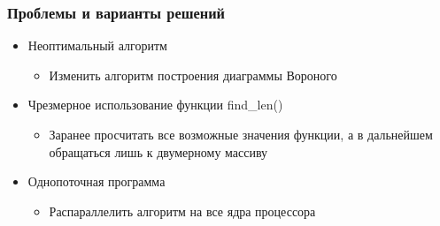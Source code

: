 \documentclass[10pt]{beamer}
\begin{document}
\begin{frame}
\frametitle{Проблемы и варианты решений}


\begin{block}{}
  \begin{itemize}
    \item Неоптимальный алгоритм
    \begin{itemize}
      \item Изменить алгоритм построения диаграммы Вороного
    \end{itemize}
    \item Чрезмерное использование функции find\_len()
    \begin{itemize}
      \item Заранее просчитать все возможные значения функции, а в дальнейшем обращаться лишь к двумерному массиву
    \end{itemize}
    \item Однопоточная программа
    \begin{itemize}
      \item Распараллелить алгоритм на все ядра процессора
    \end{itemize}
  \end{itemize}
\end{block}


\end{frame}
\end{document}
